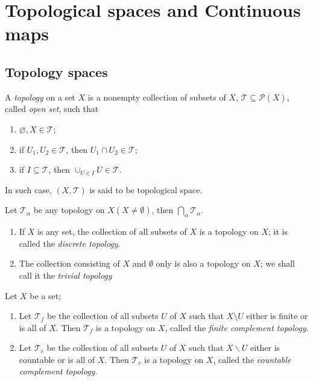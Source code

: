 \section{Topological spaces and Continuous maps}

\subsection{Topology spaces}

\begin{definition}
  A \emph{topology} on a set \( X \) is a nonempty collection  of subsets of \(
  X \), \( \mathcal{T} \subseteq \mathcal{P}(X) \), called \emph{open set}, such
  that
  \begin{enumerate}
    \item \( \varnothing, X \in \mathcal{T} \);
    \item if \( U_1, U_2 \in \mathcal{T} \), then \( U_1 \cap U_2 \in
      \mathcal{T} \);
    \item if \( I \subseteq \mathcal{T} \), then \( \cup_{U \in I} U \in
      \mathcal{T} \).
  \end{enumerate}
  In such case, \( (X, \mathcal{T}) \) is said to be topological space.
\end{definition}
\begin{proposition}
  Let \( \mathcal{T}_\alpha \) be any topology on \( X(X \neq \emptyset) \),
  then \( \bigcap_\alpha \mathcal{T}_\alpha \).
\end{proposition}

\begin{example}
  \begin{enumerate}
    \item If \( X \) is any set, the collection of all subsets of \( X \) is a
      topology on \( X \); it is called the \emph{discrete topology}.
    \item The collection consisting of \( X \) and \( \emptyset \) only is also
      a topology on \( X \); we shall call it the \emph{trivial topology}
  \end{enumerate}
\end{example}

\begin{example}
  Let \( X \) be a set;
  \begin{enumerate}
    \item Let \( \mathcal{T}_f \) be the collection of all subsets \( U \) of \(
      X \) such that \( X \setminus U \) either is finite or is all of \( X \).
      Then \( \mathcal{T}_f \) is a topology on \( X \), called the \emph{finite
      complement topology}.
    \item Let \( \mathcal{T}_c \) be the collection of all subsets \( U \) of \(
      X \) such that \( X \backslash U \) either is countable or is all of \( X
      \). Then \( \mathcal{T}_c \) is a topology on \( X \), called the
      \emph{countable complement topology}.
  \end{enumerate}
\end{example}


